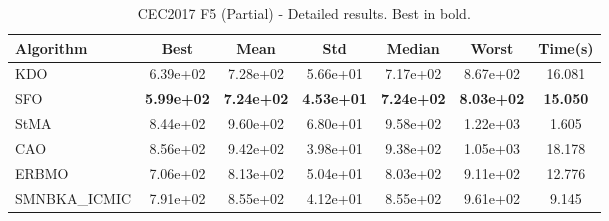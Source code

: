 \begin{table}[H]
\centering\small
\caption{CEC2017 F5 (Partial) - Detailed results. Best in bold.}
\label{tab:cec2017_F5}
\begin{tabular}{lcccccc}
\toprule
\textbf{Algorithm} & \textbf{Best} & \textbf{Mean} & \textbf{Std} & \textbf{Median} & \textbf{Worst} & \textbf{Time(s)} \\
\midrule
KDO & 6.39e+02 & 7.28e+02 & 5.66e+01 & 7.17e+02 & 8.67e+02 & 16.081 \\
SFO & \textbf{5.99e+02} & \textbf{7.24e+02} & \textbf{4.53e+01} & \textbf{7.24e+02} & \textbf{8.03e+02} & \textbf{15.050} \\
StMA & 8.44e+02 & 9.60e+02 & 6.80e+01 & 9.58e+02 & 1.22e+03 & 1.605 \\
CAO & 8.56e+02 & 9.42e+02 & 3.98e+01 & 9.38e+02 & 1.05e+03 & 18.178 \\
ERBMO & 7.06e+02 & 8.13e+02 & 5.04e+01 & 8.03e+02 & 9.11e+02 & 12.776 \\
SMNBKA_ICMIC & 7.91e+02 & 8.55e+02 & 4.12e+01 & 8.55e+02 & 9.61e+02 & 9.145 \\
\bottomrule
\end{tabular}
\end{table}
